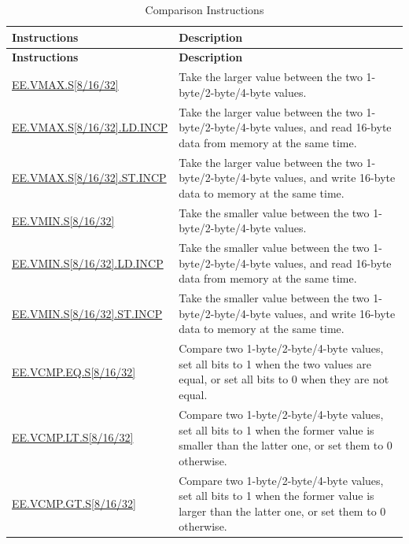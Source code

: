 \begin{longtable}[c]{|l|m{11cm}|}
    \caption{Comparison Instructions}
    \label{tab:pie-comparison-instructions}\\
    \hline
    \rowcolor{lightgray}
    \textbf{Instructions} & \textbf{Description} \\\hline
    \endfirsthead
    \rowcolor{lightgray}
    \textbf{Instructions} & \textbf{Description} \\\hline
    \endhead
    \endfoot
    
    \hyperref[instruction:EEVMAXS8]{EE.VMAX.S[8/16/32]} & Take the larger value between the two 1-byte/2-byte/4-byte values.
    \\\hline
    \hyperref[instruction:EEVMAXS8LDINCP]{EE.VMAX.S[8/16/32].LD.INCP} & Take the larger value between the two 1-byte/2-byte/4-byte values, and read 16-byte data from memory at the same time.
    \\\hline
    \hyperref[instruction:EEVMAXS8STINCP]{EE.VMAX.S[8/16/32].ST.INCP} & Take the larger value between the two 1-byte/2-byte/4-byte values, and write 16-byte data to memory at the same time.
    \\\hline
    \hyperref[instruction:EEVMINS8]{EE.VMIN.S[8/16/32]} & Take the smaller value between the two 1-byte/2-byte/4-byte values.
    \\\hline
    \hyperref[instruction:EEVMINS8LDINCP]{EE.VMIN.S[8/16/32].LD.INCP} & Take the smaller value between the two 1-byte/2-byte/4-byte values, and read 16-byte data from memory at the same time.
    \\\hline
    \hyperref[instruction:EEVMINS8STINCP]{EE.VMIN.S[8/16/32].ST.INCP} & Take the smaller value between the two 1-byte/2-byte/4-byte values, and write 16-byte data to memory at the same time.
    \\\hline
    \hyperref[instruction:EEVCMPEQS8]{EE.VCMP.EQ.S[8/16/32]} & Compare two 1-byte/2-byte/4-byte values, set all bits to 1 when the two values are equal, or set all bits to 0 when they are not equal.
    \\\hline
    \hyperref[instruction:EEVCMPLTS8]{EE.VCMP.LT.S[8/16/32]} & Compare two 1-byte/2-byte/4-byte values, set all bits to 1 when the former value is smaller than the latter one, or set them to 0 otherwise.
    \\\hline
    \hyperref[instruction:EEVCMPGTS8]{EE.VCMP.GT.S[8/16/32]} & Compare two 1-byte/2-byte/4-byte values, set all bits to 1 when the former value is larger than the latter one, or set them to 0 otherwise.
    \\\hline
\end{longtable}